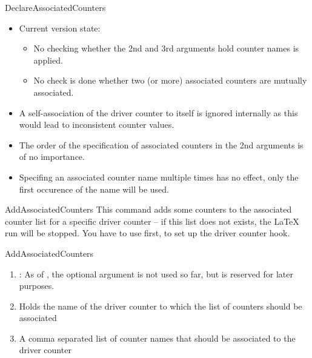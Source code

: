 \documentclass[12pt,paper=a4]{article}
\def\packageversion{\assoccntpackageversion}%
\begin{document}
\begin{docCommand}{DeclareAssociatedCounters}{}
\begin{itemize}
  \item Current version state:
    \begin{itemize}
      \item No checking whether the 2nd and 3rd arguments hold counter names is applied.
      \item No check is done whether two (or more) associated counters are mutually associated. 
      \end{itemize}
  \item A self-association of the driver counter to itself is ignored internally as this would lead to inconsistent counter values. 
  \item The order of the specification of associated counters in the 2nd arguments is of no importance.
  \item Specifing an associated counter name multiple times has no effect, only the first occurence of the name will be used.
\end{itemize}

\end{docCommand}


\begin{docCommand}{AddAssociatedCounters}{}
This command adds some counters to the associated counter list for a specific driver counter -- if this list does not exists, the \LaTeX{} run will be stopped. You have to use  first, to set up the driver counter hook.


\begin{docCommandArgs}{AddAssociatedCounters}

\begin{enumerate}[label={\textcolor{blue}{\#\arabic*}}]
  \item {}: As of \packageversion, the optional argument  is not used so far, but is reserved for later purposes.

  \item {} 

    Holds the name of the driver counter to which the list of counters should be associated
\item {}

  A comma separated list of counter names that should be associated to the driver counter
\end{enumerate}
\end{docCommandArgs}



\end{docCommand}%
\end{document}

